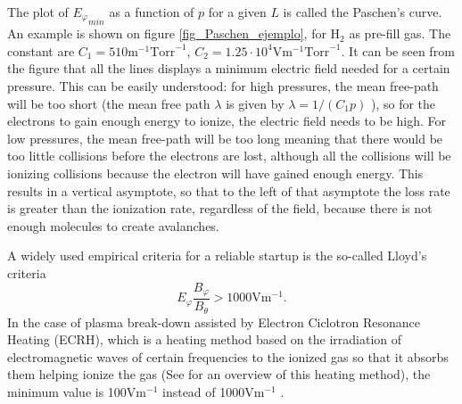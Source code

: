 \documentclass[a4paper,12pt,oneside]{book}
\begin{document}
The plot of ${E_\varphi}_{min}$ as a function of $p$ for a given $L$ is called the Paschen's curve. An example is shown on figure \ref{fig_Paschen_ejemplo}, for H$_2$ as pre-fill gas. The constant are $C_1=510 \text{m}^{-1} \text{Torr}^{-1}$, $C_2=1.25 \cdot 10^4 \text{V} \text{m}^{-1} \text{Torr}^{-1}$. It can be seen from the figure that all the lines displays a minimum electric field needed for a certain pressure. This can be easily understood: for high pressures, the mean free-path will be too short (the mean free path $\lambda$ is given by $\lambda=1/(C_1 p)$ \cite{KimThesis}), so for the electrons to gain enough energy to ionize, the electric field needs to be high. For low pressures, the mean free-path will be too long meaning that there would be too little collisions before the electrons are lost, although all the collisions will be ionizing collisions because the electron will have gained enough energy. This results in a vertical asymptote, so that to the left of that asymptote the loss rate is greater than the ionization rate, regardless of the field, because there is not enough molecules to create avalanches.

A widely used empirical criteria for a reliable startup is the so-called Lloyd's criteria \cite{ITER_1999}
%
\begin{equation}
E_\varphi \dfrac{B_\varphi}{B_\theta} >1000 \text{V}\text{m}^{-1}.
\end{equation}
In the case of plasma break-down assisted by Electron Ciclotron Resonance Heating (ECRH), which is a heating method based on the irradiation of electromagnetic waves of certain frequencies to the ionized gas so that it absorbs them helping ionize the gas (See \cite{ITER_2019} for an overview of this heating method), the minimum value is 100$\text{V}\text{m}^{-1}$ instead of 1000$\text{V}\text{m}^{-1}$ \cite{VEST_2015}.
\end{document}

